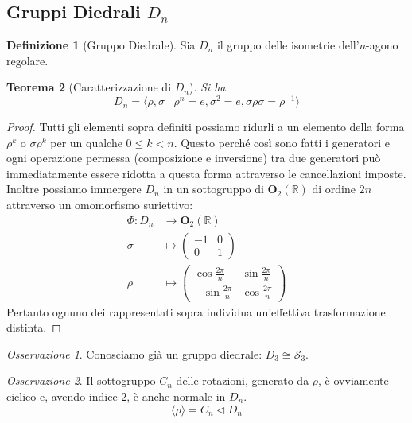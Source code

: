 \documentclass[a4paper]{article}
\newtheorem{theorem}{Teorema}[section]
\theoremstyle{remark}
\newtheorem*{remark}{Osservazione}
\theoremstyle{definition}
\newtheorem{definition}[theorem]{Definizione}
\begin{document}
\subsection{Gruppi Diedrali  $ D_n $}
\begin{multicols}{2}
\begin{definition}[Gruppo Diedrale]
	Sia $ D_n $ il gruppo delle isometrie dell'$ n $-agono regolare.
\end{definition}
\begin{theorem}[Caratterizzazione di $ D_n $]
	Si ha \[ D_n = \langle \rho, \sigma \mid \rho ^n = e, \sigma^2 = e, \sigma \rho \sigma = \rho^{-1} \rangle \]
\end{theorem}
\begin{proof}
	Tutti gli elementi sopra definiti possiamo ridurli a un elemento della forma $ \rho^k $ o $ \sigma \rho^k $ per un qualche $ 0 \leq k < n $. Questo perché così sono fatti i generatori e ogni operazione permessa (composizione e inversione) tra due generatori può immediatamente essere ridotta a questa forma attraverso le cancellazioni imposte. Inoltre possiamo immergere $ D_n $ in un sottogruppo di $ \mathbf{O}_2(\mathbb{R}) $ di ordine $ 2n $ attraverso un omomorfismo suriettivo: \begin{align*}
	\Phi \colon D_n &\to \mathbf{O}_2(\mathbb{R}) \\
	\sigma &\mapsto \left(\begin{matrix}
	-1 & 0 \\
	0 & 1
	\end{matrix}\right) \\
	\rho &\mapsto \left(\begin{matrix}
	\cos\frac{2\pi}{n} & \sin\frac{2\pi}{n} \\
	-\sin\frac{2\pi}{n} & \cos\frac{2\pi}{n}
	\end{matrix}\right) 
	\end{align*}
	Pertanto ognuno dei rappresentati sopra individua un'effettiva trasformazione distinta.
\end{proof}

\begin{remark}
	Conosciamo già un gruppo diedrale: $ D_3 \cong \mathcal{S}_3 $.
\end{remark}
\begin{remark}
	Il sottogruppo $ C_n $ delle rotazioni, generato da $ \rho $, è ovviamente ciclico e, avendo indice 2, è anche normale in $ D_n $. $$ \langle \rho \rangle = C_n \lhd D_n $$
\end{remark}


\end{multicols}
\end{document}
